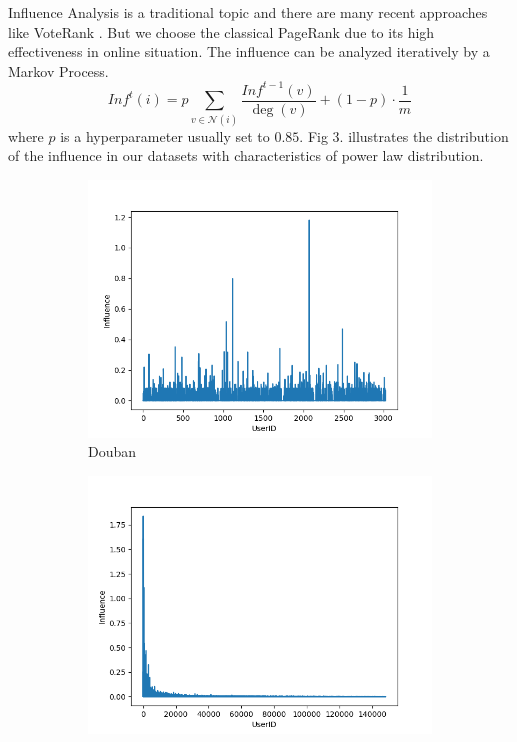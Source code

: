 \documentclass{article}
\begin{document}
Influence Analysis is a traditional topic and there are many recent approaches like VoteRank \cite{zhang2016voterank}.
But we choose the classical PageRank \cite{ser1998pagerank} due to its high effectiveness in online situation. 
The influence can be analyzed iteratively by a Markov Process.
\begin{equation}
   Inf^t(i) = p \sum_{v \in \mathcal{N}(i)} \frac{Inf^{t-1}(v)}{\deg(v)} + (1-p) \cdot \frac{1}{m}
\end{equation}
where $p$ is a hyperparameter usually set to $0.85$. 
Fig 3. illustrates the distribution of the influence in our datasets 
with characteristics of power law distribution.
\begin{figure}[h]    
    \centering
    \begin{subfigure}{0.33\textwidth}
      \centering
        \includegraphics[width=1\linewidth]{pic/figure3_1.png}
      \caption{Douban}
    \end{subfigure}%
    \begin{subfigure}{0.33\textwidth}
    \centering
        \includegraphics[width=1\linewidth]{pic/figure3_2.png}

\end{subfigure}
\end{figure}
\end{document}
